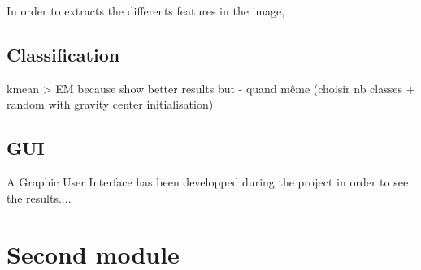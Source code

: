 In order to extracts the differents features in the image, 


\subsection{Classification}

kmean > EM because show better results 
but - quand même (choisir nb classes + random with gravity center initialisation)


\subsection{GUI}

A Graphic User Interface has been developped during the project in order to see the results.... 


\section{Second module}

